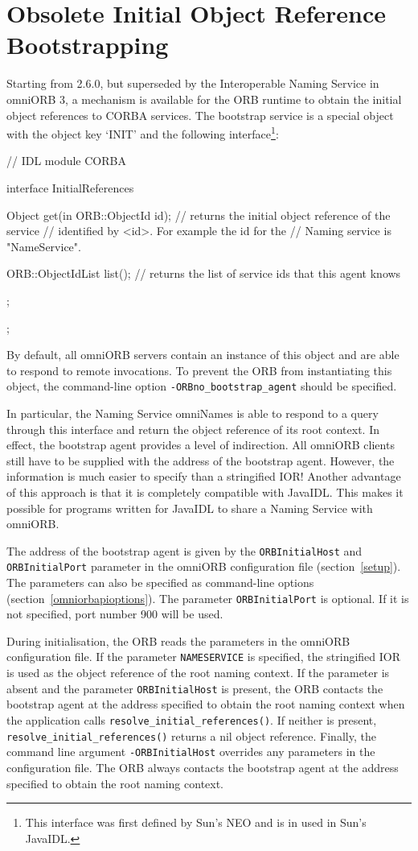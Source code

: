\documentclass[11pt,twoside,a4paper]{book}
\newcommand{\op}[1]{\texttt{#1()}}
\newcommand{\cmdline}[1]{\texttt{#1}}
\newcommand{\dsc}{\discretionary{}{}{}}
\begin{document}
\section{Obsolete Initial Object Reference Bootstrapping}
\label{bootstrap}

Starting from 2.6.0, but superseded by the Interoperable Naming
Service in omniORB 3, a mechanism is available for the ORB runtime to
obtain the initial object references to CORBA services. The bootstrap
service is a special object with the object key `INIT' and the
following interface\footnote{This interface was first defined by Sun's
NEO and is in used in Sun's JavaIDL.}:

\begin{idllisting}
  // IDL
  module CORBA {
    interface InitialReferences {
      Object get(in ORB::ObjectId id);
      // returns the initial object reference of the service
      // identified by <id>. For example the id for the
      // Naming service is "NameService".

      ORB::ObjectIdList list();
      // returns the list of service ids that this agent knows
   };
 };
\end{idllisting}

By default, all omniORB servers contain an instance of this object and
are able to respond to remote invocations. To prevent the ORB from
instantiating this object, the command-line option
\cmdline{-ORBno\_bootstrap\_agent} should be specified.

In particular, the Naming Service omniNames is able to respond to a
query through this interface and return the object reference of its
root context. In effect, the bootstrap agent provides a level of
indirection.  All omniORB clients still have to be supplied with the
address of the bootstrap agent. However, the information is much
easier to specify than a stringified IOR!  Another advantage of this
approach is that it is completely compatible with JavaIDL. This makes
it possible for programs written for JavaIDL to share a Naming
Service with omniORB.

The address of the bootstrap agent is given by the
\texttt{ORBInitialHost} and \texttt{ORBInitialPort} parameter in the
omniORB configuration file (section~\ref{setup}). The parameters can
also be specified as command-line options
(section~\ref{omniorbapioptions}). The parameter
\texttt{ORBInitialPort} is optional. If it is not specified, port
number 900 will be used.

During initialisation, the ORB reads the parameters in the omniORB
configuration file. If the parameter \texttt{NAMESERVICE} is
specified, the stringified IOR is used as the object reference of the
root naming context. If the parameter is absent and the parameter
\texttt{ORBInitialHost} is present, the ORB contacts the bootstrap
agent at the address specified to obtain the root naming context when
the application calls \op{resolve\_initial\_references}. If neither is
present, \op{resolve\_\dsc{}initial\_references} returns a nil object
reference. Finally, the command line argument
\cmdline{-ORBInitialHost} overrides any parameters in the
configuration file. The ORB always contacts the bootstrap agent at the
address specified to obtain the root naming context.
\end{document}
